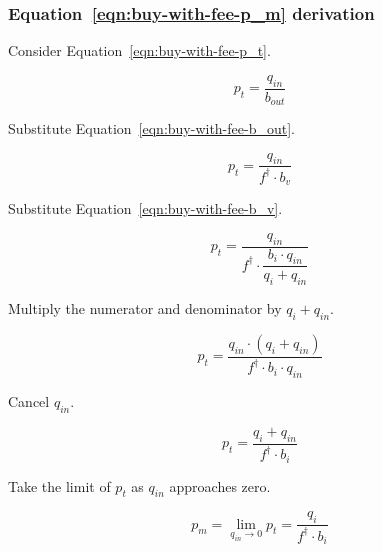 \subsubsection{Equation~\ref{eqn:buy-with-fee-p_m} derivation}%
\label{sssec:equation-eqn-buy-with-fee-p-m-derivation}

Consider Equation~\ref{eqn:buy-with-fee-p_t}.

\begin{equation*}
	p_t = \frac{q_{in}}{b_{out}}
\end{equation*}

Substitute Equation~\ref{eqn:buy-with-fee-b_out}.

\begin{equation*}
	p_t = \frac{q_{in}}{f^{\dagger} \cdot b_v}
\end{equation*}

Substitute Equation~\ref{eqn:buy-with-fee-b_v}.

\begin{equation*}
	p_t = \frac{q_{in}}{f^{\dagger} \cdot \dfrac{b_i \cdot q_{in}}{q_i + q_{in}}}
\end{equation*}

Multiply the numerator and denominator by $q_i + q_{in}$.

\begin{equation*}
	p_t = \frac{q_{in} \cdot (q_i + q_{in})}{f^{\dagger} \cdot b_i \cdot q_{in}}
\end{equation*}

Cancel $q_{in}$.

\begin{equation*}
	p_t = \frac{q_i + q_{in}}{f^{\dagger} \cdot b_i}
\end{equation*}

Take the limit of $p_t$ as $q_{in}$ approaches zero.

\begin{equation}
	p_m = \lim_{q_{in} \to 0} p_t = \frac{q_i}{f^{\dagger} \cdot b_i} \nonumber
\end{equation}
